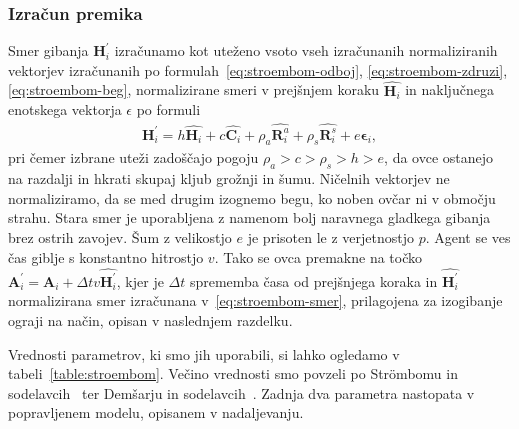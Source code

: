 \subsubsection{Izračun premika}

Smer gibanja $\mathbf{H}_i^\prime$ izračunamo kot uteženo vsoto vseh izračunanih normaliziranih vektorjev izračunanih po formulah~\eqref{eq:stroembom-odboj}, \eqref{eq:stroembom-zdruzi}, \eqref{eq:stroembom-beg}, normalizirane smeri v prejšnjem koraku $\hat{\mathbf{H}_{i}}$ in naključnega enotskega vektorja $\epsilon$ po formuli
\begin{align}
\mathbf{H}_i^\prime = h\hat{\mathbf{H}_{i}} + c\hat{\mathbf{C}_i} + \rho_a\hat{\mathbf{R}_i^a} + \rho_s\hat{\mathbf{R}_i^s} + e\mathbf{\epsilon}_i, \label{eq:stroembom-smer}
\end{align}
pri čemer izbrane uteži zadoščajo pogoju $\rho_a > c > \rho_s > h > e$, da ovce ostanejo na razdalji in hkrati skupaj kljub grožnji in šumu. Ničelnih vektorjev ne normaliziramo, da se med drugim izognemo begu, ko noben ovčar ni v območju strahu. Stara smer je uporabljena z namenom bolj naravnega gladkega gibanja brez ostrih zavojev. Šum z velikostjo $e$ je prisoten le z verjetnostjo $p$. Agent se ves čas giblje s konstantno hitrostjo $v$. Tako se ovca premakne na točko $\mathbf{A}_i^\prime =\mathbf{A}_i + \Delta t v\hat{\mathbf{H}_i^\prime}$, kjer je $\Delta t$ sprememba časa od prejšnjega koraka in $\hat{\mathbf{H}_i^\prime}$ normalizirana smer izračunana v~\eqref{eq:stroembom-smer}, prilagojena za izogibanje ograji na način, opisan v naslednjem razdelku.

Vrednosti parametrov, ki smo jih uporabili, si lahko ogledamo v tabeli~\ref{table:stroembom}. Večino vrednosti smo povzeli po Str{\"o}mbomu in sodelavcih~\cite{Stroembom} ter Demšarju in sodelavcih~\cite{Demsar}. Zadnja dva parametra nastopata v popravljenem modelu, opisanem v nadaljevanju.

